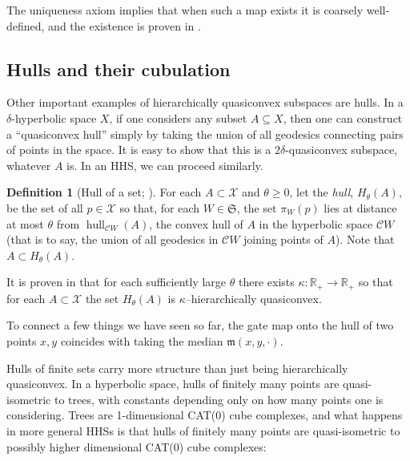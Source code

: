 \documentclass[11pt,oneside]{amsart}
\newcounter{ax}
\theoremstyle{definition}
\newtheorem{defn}[thm]{Definition}
\DeclareMathOperator{\hull}{hull}
\newcommand{\field}[1]{\mathbb{#1}}
\newcommand{\reals}{\ensuremath{\field{R}}}
\newcommand{\co}{\colon}
\newcommand{\cuco}[1]{{\mathcal #1}}
\newcommand{\fontact}{{\mathcal C}}
\newcommand{\median}{\mathfrak m}
\begin{document}
The uniqueness axiom implies that when such a map exists it 
is coarsely well-defined, and the existence is proven in \cite[Lemma 5.5]{HHS2}.



\subsection{Hulls and their cubulation}

Other important examples of hierarchically quasiconvex subspaces are hulls. In a $\delta$-hyperbolic space $X$, if one considers any subset $A\subseteq X$, then one can construct a ``quasiconvex hull'' simply by taking the union of all geodesics connecting pairs of points in the space. It is easy to show that this is a $2\delta$-quasiconvex subspace, whatever $A$ is. In an HHS, we can proceed similarly.

\begin{defn}[Hull of a set; \cite{HHS2}]\label{defn:hull}
 For each $A\subset \cuco X$ and $\theta\geq 0$, let the \emph{hull}, 
 $H_{\theta}(A)$,  be the set of all $p\in\cuco X$ so that, for each
 $W\in\mathfrak S$, the set $\pi_W(p)$ lies at distance at most
 $\theta$ from $\hull_{\fontact W}(A)$, the convex hull of $A$ in the 
 hyperbolic space $\fontact W$ (that is to say, the union of all geodesics in $\fontact W$ joining points of $A$). 
 Note that $A\subset H_{\theta}(A)$.
\end{defn}


It is proven in \cite[Lemma 6.2]{HHS2} that for each sufficiently large $\theta$ there
exists $\kappa\co\reals_+\to\reals_+$ so that for each $A\subset 
\cuco X$ the set $H_\theta(A)$ is
$\kappa$--hierarchically quasiconvex.

To connect a few things we have seen so far, the gate map onto the hull of two points $x,y$ coincides with taking the median $\median(x,y,\cdot)$.


Hulls of finite sets carry more structure than just being hierarchically quasiconvex. In a hyperbolic space, hulls of finitely many points are quasi-isometric to trees, with constants depending only on how many points one is considering. Trees are 1-dimensional CAT(0) cube complexes, and what happens in more general HHSs is that hulls of finitely many points are quasi-isometric to possibly higher dimensional CAT(0) cube complexes:
\end{document}
